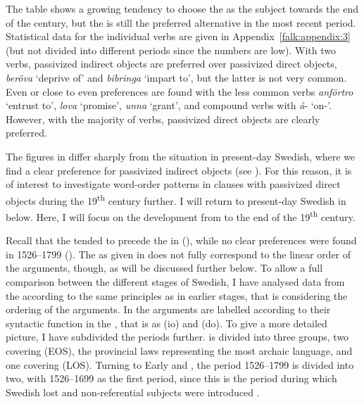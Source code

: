 \documentclass[output=paper]{langscibook}
\begin{document}
The table shows a growing tendency to choose the  as the subject towards the end of the century, but the  is still the preferred alternative in the most recent period. Statistical data for the individual verbs are given in Appendix~\ref{falk:appendix:3} (but not divided into different periods since the numbers are low). With two verbs, passivized indirect objects are preferred over passivized direct objects, \textit{beröva} ‘deprive of’ and \textit{bibringa} ‘impart to’, but the latter is not very common. Even or close to even preferences are found with the less common verbs \textit{anförtro} ‘entrust to’, \textit{lova} ‘promise’, \textit{unna} ‘grant’, and compound verbs with \textit{å}{}- ‘on-’. However, with the majority of verbs, passivized direct objects are clearly preferred.\largerpage


The figures in  differ sharply from the situation in present-day Swedish, where we find a clear preference for passivized indirect objects (see ). For this reason, it is of interest to investigate word-order patterns in clauses with passivized direct objects during the 19\textsuperscript{th} century further. I will return to present-day Swedish in  below. Here, I will focus on the development from  to the end of the 19\textsuperscript{th} century.



Recall that the  tended to precede the  in  (), while no clear preferences were found in 1526–1799 (). The  as given in  does not fully correspond to the linear order of the arguments, though, as will be discussed further below. To allow a full comparison between the different stages of Swedish, I have analysed data from the  according to the same principles as in earlier stages, that is considering the ordering of the arguments. In  the arguments are labelled according to their syntactic function in the , that is as  (io) and  (do). To give a more detailed picture, I have subdivided the periods further.  is divided into three groups, two covering  (EOS), the provincial laws representing the most archaic language, and one covering  (LOS). Turning to Early and , the period 1526–1799 is divided into two, with 1526–1699 as the first period, since this is the period during which Swedish lost  and non-referential subjects were introduced \citep{Falk1993}.
\end{document}
